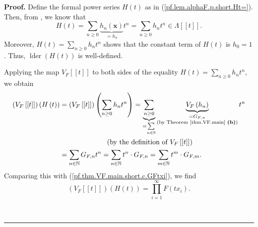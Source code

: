 \documentclass[numbers=enddot,12pt,final,onecolumn,notitlepage]{scrartcl}%
\theoremstyle{definition}
\newenvironment{proof}[1][Proof]{\noindent\textbf{#1.} }{\ \rule{0.5em}{0.5em}}
\let\sumnonlimits\sum
\let\prodnonlimits\prod
\renewcommand{\sum}{\sumnonlimits\limits}
\renewcommand{\prod}{\prodnonlimits\limits}
\newenvironment{vershort}{}{}
\begin{document}
\begin{vershort}
\begin{proof}
Define the formal power series $H\left(  t\right)  $ as in
(\ref{pf.lem.alphaF.p.short.Ht=}). Then, from \cite[(2.4.1)]{GriRei}, we know
that%
\[
H\left(  t\right)  =\sum_{n\geq0}\underbrace{h_{n}\left(  \mathbf{x}\right)
}_{=h_{n}}t^{n}=\sum_{n\geq0}h_{n}t^{n}\in\Lambda\left[  \left[  t\right]
\right]  .
\]
Moreover, $H\left(  t\right)  =\sum_{n\geq0}h_{n}t^{n}$ shows that the
constant term of $H\left(  t\right)  $ is $h_{0}=1$. Thus,
$\operatorname*{lder}\left(  H\left(  t\right)  \right)  $ is well-defined.

Applying the map $V_{F}\left[  \left[  t\right]  \right]  $ to both sides of
the equality $H\left(  t\right)  =\sum_{n\geq0}h_{n}t^{n}$, we obtain%
\begin{align*}
\left(  V_{F}\left[  \left[  t\right]  \right]  \right)  \left(  H\left(
t\right)  \right)   &  =\left(  V_{F}\left[  \left[  t\right]  \right]
\right)  \left(  \sum_{n\geq0}h_{n}t^{n}\right)  =\underbrace{\sum_{n\geq0}%
}_{=\sum_{n\in\mathbb{N}}}\underbrace{V_{F}\left(  h_{n}\right)
}_{\substack{=G_{F,n}\\\text{(by Theorem \ref{thm.VF.main} \textbf{(b)})}%
}}t^{n}\\
&  \ \ \ \ \ \ \ \ \ \ \ \ \ \ \ \ \ \ \ \ \left(  \text{by the definition of
}V_{F}\left[  \left[  t\right]  \right]  \right) \\
&  =\sum_{n\in\mathbb{N}}G_{F,n}t^{n}=\sum_{n\in\mathbb{N}}t^{n}\cdot
G_{F,n}=\sum_{m\in\mathbb{N}}t^{m}\cdot G_{F,m}.
\end{align*}
Comparing this with (\ref{pf.thm.VF.main.short.c.GFtxi}), we find%
\begin{equation}
\left(  V_{F}\left[  \left[  t\right]  \right]  \right)  \left(  H\left(
t\right)  \right)  =\prod_{i=1}^{\infty}F\left(  tx_{i}\right)  .
\label{pf.thm.VF.main.short.c.GFtxi2}%
\end{equation}



\end{proof}
\end{vershort}
\end{document}
